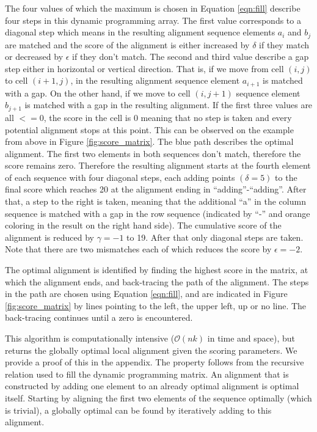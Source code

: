 \documentclass[12pt]{article} %
\begin{document}
The four values of which the maximum is chosen in Equation \ref{eqn:fill} describe four steps in this dynamic programming array. The first value corresponds to a diagonal step which means in the resulting alignment sequence elements $a_i$ and $b_j$ are matched and the score of the alignment is either increased by $\delta$ if they match or decreased by $\epsilon$ if they don't match. The second and third value describe a gap step either in horizontal or vertical direction. That is, if we move from cell $(i,j)$ to cell $(i+1,j)$, in the resulting alignment sequence element $a_{i+1}$ is matched with a gap. On the other hand, if we move to cell $(i, j+1)$ sequence element $b_{j+1}$ is matched with a gap in the resulting alignment. If the first three values are all $<= 0$, the score in the cell is 0 meaning that no step is taken and every potential alignment stops at this point. This can be observed on the example from above in Figure \ref{fig:score_matrix}. The blue path describes the optimal alignment. The first two elements in both sequences don't match, therefore the score remains zero. Therefore the resulting alignment starts at the fourth element of each sequence with four diagonal steps, each adding points $(\delta = 5)$ to the final score which reaches 20 at the alignment ending in ``adding''-``adding''. After that, a step to the right is taken, meaning that the additional ``a'' in the column sequence is matched with a gap in the row sequence (indicated by ``-'' and orange coloring in the result on the right hand side). The cumulative score of the alignment is reduced by $\gamma = -1$ to 19. After that only diagonal steps are taken. Note that there are two mismatches each of which reduces the score by $\epsilon = -2$. 

The optimal alignment is identified by finding the highest score in the matrix, at which the alignment ends, and back-tracing the path of the alignment. The steps in the path are chosen using Equation \ref{eqn:fill}, and are indicated in Figure \ref{fig:score_matrix} by lines pointing to the left, the upper left, up or no line. The back-tracing continues until a  zero is encountered.

This algorithm is computationally intensive ($\mathcal{O}(nk)$ in time and space), but returns the globally optimal local alignment given the scoring parameters. We provide a proof of this in the appendix. The property follows from the recursive relation used to fill the dynamic programming matrix. An alignment that is constructed by adding one element to an already optimal alignment is optimal itself. Starting by aligning the first two elements of the sequence optimally (which is trivial), a globally optimal can be found by iteratively adding to this alignment.
\end{document}
